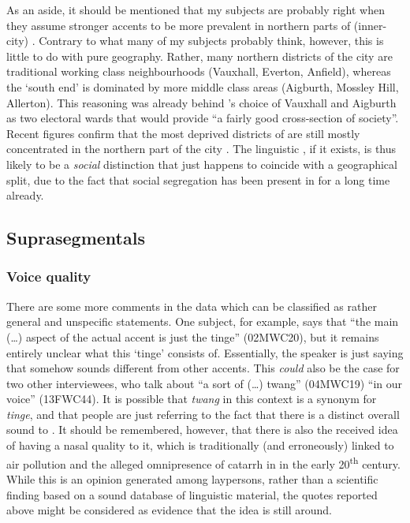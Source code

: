 As an aside, it should be mentioned that my subjects are probably right when they assume stronger accents to be more prevalent in northern parts of (inner-city) .
Contrary to what many of my subjects probably think, however, this is little to do with pure geography.
Rather, many northern districts of the city are traditional working class neighbourhoods (Vauxhall, Everton, Anfield), whereas the `south end' is dominated by more middle class areas (Aigburth, Mossley Hill, Allerton).
This reasoning was already behind \citeauthor{knowles1973}'s choice of Vauxhall and Aigburth as two electoral wards that would provide ``a fairly good cross-section of  society''\parencite[2]{knowles1973}.
Recent figures confirm that the most deprived districts of  are still mostly concentrated in the northern part of the city \parencite[cf.][iii]{lcc2010}.
The linguistic , if it exists, is thus likely to be a \emph{social} distinction that just happens to coincide with a geographical split, due to the fact that social segregation has been present in  for a long time already.

\subsection{Suprasegmentals}
\label{sec.qual.supra}

\subsubsection{Voice quality}

There are some more comments in the data which can be classified as rather general and unspecific statements.
One subject, for example, says that ``the main (\ldots) aspect of the actual accent is just the tinge'' (02MWC20), but it remains entirely unclear what this `tinge' consists of.
Essentially, the speaker is just saying that  somehow sounds different from other accents.
This \emph{could} also be the case for two other interviewees, who talk about ``a sort of (\ldots) twang'' (04MWC19) ``in our voice'' (13FWC44).
It is possible that \emph{twang} in this context is a synonym for \emph{tinge}, and that people are just referring to the fact that there is a distinct overall sound to .
It should be remembered, however, that there is also the received idea of  having a nasal quality to it, which is traditionally (and erroneously) linked to air pollution and the alleged omnipresence of catarrh in  in the early 20\textsuperscript{th} century.
While this is an opinion generated among laypersons, rather than a scientific finding based on a sound database of linguistic material, the quotes reported above might be considered as evidence that the idea is still around.

